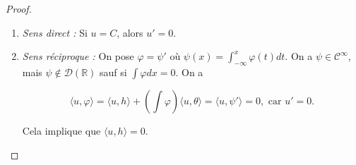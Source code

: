 \documentclass[french]{book}
\theoremstyle{definition}
\begin{document}
\begin{proof}

  \

  \begin{enumerate}
    \item \emph{Sens direct :} Si \(u = C\), alors \(u' = 0\).
    \item \emph{Sens réciproque : } On pose \(\varphi = \psi'\) où \(\psi(x) = \displaystyle \int_{-\infty}^{x}\varphi(t)dt\). On a \(\psi \in \mathcal{C}^{\infty}\), mais \(\psi \notin \mathscr{D}(\mathbb{R})\) sauf si \(\int \varphi dx = 0\). On  a

    \[\langle u, \varphi \rangle  = \langle u, h \rangle + \left(\int \varphi\right) \langle u, \theta \rangle = \langle u, \psi' \rangle = 0, \text{ car } u'=0.\]

    Cela implique que \(\langle u, h \rangle  =0\).
  \end{enumerate}
\end{proof}
\end{document}
